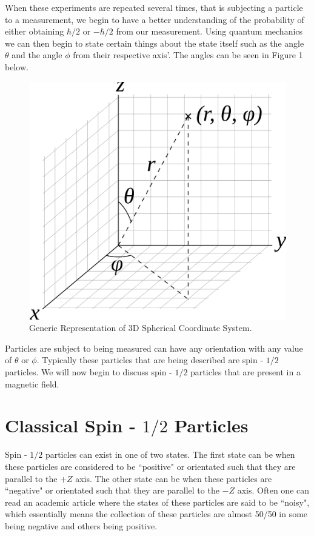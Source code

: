 \documentclass[twocolumn]{article}
\begin{document}
When these experiments are repeated several times, that is subjecting a particle to a measurement, we begin to have a better understanding of the probability of either obtaining $\hbar/2$ or $-\hbar/2$ from our measurement. Using quantum mechanics we can then begin to state certain things about the state itself such as the angle $\theta$ and the angle $\phi$ from their respective axis'. The angles can be seen in Figure 1 below.
\begin{figure}[htbp]
\begin{center}
\includegraphics[width=0.75\linewidth]{Spherical-Coordinate-System.png}
\caption{Generic Representation of 3D Spherical Coordinate System.}
\end{center}
\end{figure}
\newline
\newline
Particles are subject to being measured can have any orientation with any value of $\theta$ or $\phi$. Typically these particles that are being described are spin - $1/2$ particles. We will now begin to discuss spin - $1/2$ particles that are present in a magnetic field.
\section*{Classical Spin - $1/2$ Particles}
Spin - $1/2$ particles can exist in one of two states. The first state can be when these particles are considered to be ``positive" or orientated such that they are parallel to the $+Z$ axis. The other state can be when these particles are ``negative" or orientated such that they are parallel to the $-Z$ axis. Often one can read an academic article where the states of these particles are said to be ``noisy", which essentially means the collection of these particles are almost 50/50 in some being negative and others being positive.
\end{document}
